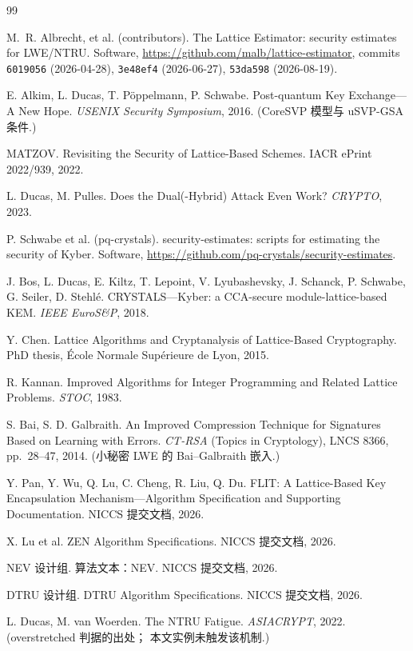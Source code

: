 \documentclass[11pt,a4paper,zihao=-4]{ctexart}
\newcommand{\code}[1]{\texttt{#1}}
\begin{document}
\begin{thebibliography}{99}\small

M.~R. Albrecht, et al. (contributors).
\newblock The Lattice Estimator: security estimates for LWE/NTRU.
\newblock Software, \url{https://github.com/malb/lattice-estimator},
  commits \code{6019056} (2026-04-28), \code{3e48ef4} (2026-06-27),
  \code{53da598} (2026-08-19).

E. Alkim, L. Ducas, T. Pöppelmann, P. Schwabe.
\newblock Post-quantum Key Exchange---A New Hope.
\newblock \emph{USENIX Security Symposium}, 2016. (CoreSVP 模型与
  uSVP-GSA 条件.)

MATZOV.
\newblock Revisiting the Security of Lattice-Based Schemes.
\newblock IACR ePrint 2022/939, 2022.

L. Ducas, M. Pulles.
\newblock Does the Dual(-Hybrid) Attack Even Work?
\newblock \emph{CRYPTO}, 2023.

P. Schwabe et al. (pq-crystals).
\newblock security-estimates: scripts for estimating the security
  of Kyber.
\newblock Software,
  \url{https://github.com/pq-crystals/security-estimates}.

J. Bos, L. Ducas, E. Kiltz, T. Lepoint, V. Lyubashevsky, J. Schanck,
P. Schwabe, G. Seiler, D. Stehlé.
\newblock CRYSTALS---Kyber: a CCA-secure module-lattice-based KEM.
\newblock \emph{IEEE EuroS\&P}, 2018.

Y. Chen.
\newblock Lattice Algorithms and Cryptanalysis of Lattice-Based
  Cryptography.
\newblock PhD thesis, École Normale Supérieure de Lyon, 2015.

R. Kannan.
\newblock Improved Algorithms for Integer Programming and Related
  Lattice Problems.
\newblock \emph{STOC}, 1983.

S. Bai, S. D. Galbraith.
\newblock An Improved Compression Technique for Signatures Based
  on Learning with Errors.
\newblock \emph{CT-RSA} (Topics in Cryptology), LNCS 8366,
  pp.~28--47, 2014. (小秘密 LWE 的 Bai--Galbraith 嵌入.)

Y. Pan, Y. Wu, Q. Lu, C. Cheng, R. Liu, Q. Du.
\newblock FLIT: A Lattice-Based Key Encapsulation Mechanism---Algorithm
  Specification and Supporting Documentation.
\newblock NICCS 提交文档, 2026.

X. Lu et al.
\newblock ZEN Algorithm Specifications.
\newblock NICCS 提交文档, 2026.

NEV 设计组.
\newblock 算法文本：NEV.
\newblock NICCS 提交文档, 2026.

DTRU 设计组.
\newblock DTRU Algorithm Specifications.
\newblock NICCS 提交文档, 2026.

L. Ducas, M. van Woerden.
\newblock The NTRU Fatigue.
\newblock \emph{ASIACRYPT}, 2022. (overstretched 判据的出处；
  本文实例未触发该机制.)

\end{thebibliography}
\end{document}
